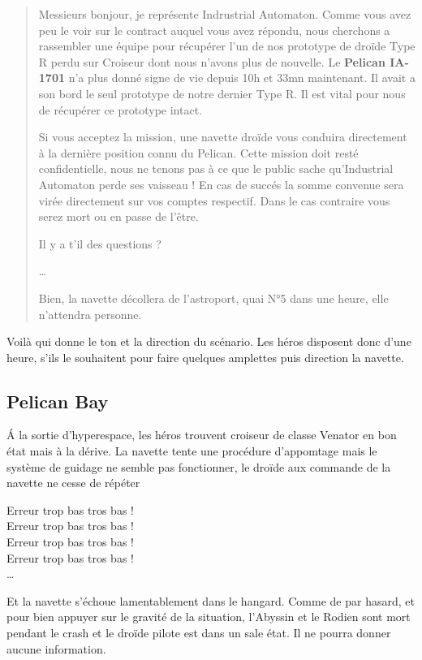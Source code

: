 \begin{quote}
	Messieurs bonjour, je représente Indrustrial Automaton.
	Comme vous avez peu le voir sur le contract auquel vous avez répondu, nous cherchons a rassembler une équipe pour récupérer l'un de nos prototype de droïde Type R perdu sur Croiseur dont nous n'avons plus de nouvelle.
	Le \textbf{Pelican IA-1701} n'a plus donné signe de vie depuis 10h et 33mn maintenant. Il avait a son bord le seul prototype de notre dernier Type R. Il est vital pour nous de récupérer ce prototype intact.

	Si vous acceptez la mission, une navette droïde vous conduira directement à la dernière position connu du Pelican. Cette mission doit resté confidentielle, nous ne tenons pas à ce que le public sache qu'Industrial Automaton perde ses vaisseau !
	En cas de succés la somme convenue sera virée directement sur vos comptes respectif. Dans le cas contraire vous serez mort ou en passe de l'être.

	Il y a t'il des questions ?

	\ldots

	Bien, la navette décollera de l'astroport, quai N°5 dans une heure, elle n'attendra personne.
\end{quote}

Voilà qui donne le ton et la direction du scénario. Les héros disposent donc d'une heure, s'ils le souhaitent pour faire quelques amplettes puis direction la navette.

\subsection{Pelican Bay}
\'A la sortie d'hyperespace, les héros trouvent croiseur de classe Venator en bon état mais à la dérive. La navette tente une procédure d'appomtage mais le système de guidage ne semble pas fonctionner, le droïde aux commande de la navette ne cesse de répéter 

\begin{flushright}
		Erreur trop bas tros bas !\\
		Erreur trop bas tros bas !\\
		Erreur trop bas tros bas !\\
		Erreur trop bas tros bas !\\
		\ldots
\end{flushright}

\vspace{5\baselineskip}
Et la navette s'échoue lamentablement dans le hangard. Comme de par hasard, et pour bien appuyer sur le gravité de la situation, l'Abyssin et le Rodien sont mort pendant le crash et le droïde pilote est dans un sale état. Il ne pourra donner aucune information.

